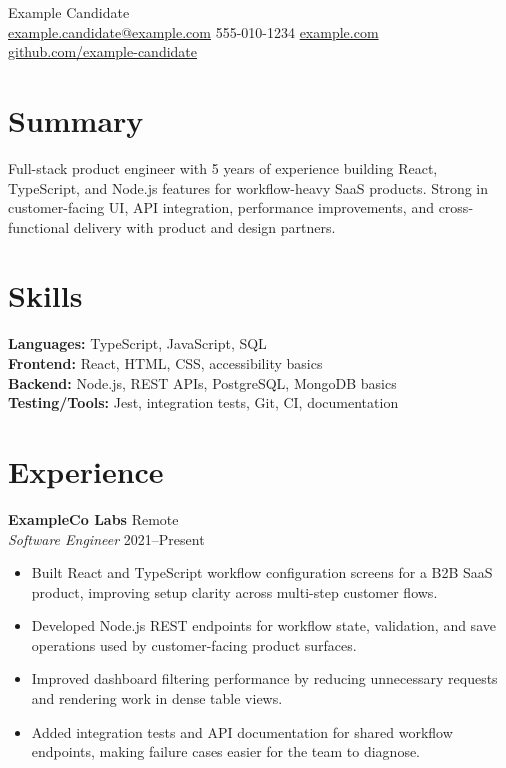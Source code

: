 \documentclass[10pt]{article}
\begin{document}
\begin{center}
{\LARGE Example Candidate}\\
\href{mailto:example.candidate@example.com}{example.candidate@example.com} \textbar{}
555-010-1234 \textbar{}
\href{https://example.com}{example.com} \textbar{}
\href{https://github.com/example-candidate}{github.com/example-candidate}
\end{center}

\section*{Summary}
Full-stack product engineer with 5 years of experience building React, TypeScript, and Node.js features for workflow-heavy SaaS products. Strong in customer-facing UI, API integration, performance improvements, and cross-functional delivery with product and design partners.

\section*{Skills}
\textbf{Languages:} TypeScript, JavaScript, SQL \\
\textbf{Frontend:} React, HTML, CSS, accessibility basics \\
\textbf{Backend:} Node.js, REST APIs, PostgreSQL, MongoDB basics \\
\textbf{Testing/Tools:} Jest, integration tests, Git, CI, documentation

\section*{Experience}
\textbf{ExampleCo Labs} \hfill Remote \\
\textit{Software Engineer} \hfill 2021--Present
\begin{itemize}
  \item Built React and TypeScript workflow configuration screens for a B2B SaaS product, improving setup clarity across multi-step customer flows.
  \item Developed Node.js REST endpoints for workflow state, validation, and save operations used by customer-facing product surfaces.
  \item Improved dashboard filtering performance by reducing unnecessary requests and rendering work in dense table views.
  \item Added integration tests and API documentation for shared workflow endpoints, making failure cases easier for the team to diagnose.
\end{itemize}
\end{document}
